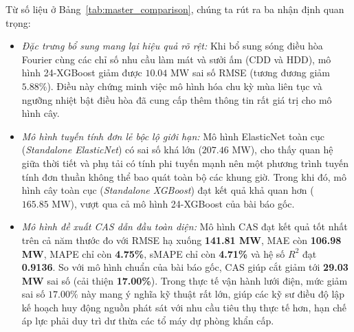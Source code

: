 Từ số liệu ở Bảng~\ref{tab:master_comparison}, chúng ta rút ra ba nhận định quan trọng:
\begin{itemize}
    \item \textit{Đặc trưng bổ sung mang lại hiệu quả rõ rệt:} Khi bổ sung sóng điều hòa Fourier cùng các chỉ số nhu cầu làm mát và sưởi ấm (CDD và HDD), mô hình 24-XGBoost giảm được $10.04\text{ MW}$ sai số RMSE (tương đương giảm $5.88\%$). Điều này chứng minh việc mô hình hóa chu kỳ mùa liên tục và ngưỡng nhiệt bật điều hòa đã cung cấp thêm thông tin rất giá trị cho mô hình cây.
    \item \textit{Mô hình tuyến tính đơn lẻ bộc lộ giới hạn:} Mô hình ElasticNet toàn cục (\textit{Standalone ElasticNet}) có sai số khá lớn ($207.46\text{ MW}$), cho thấy quan hệ giữa thời tiết và phụ tải có tính phi tuyến mạnh nên một phương trình tuyến tính đơn thuần không thể bao quát toàn bộ các khung giờ. Trong khi đó, mô hình cây toàn cục (\textit{Standalone XGBoost}) đạt kết quả khả quan hơn ($165.85\text{ MW}$), vượt qua cả mô hình 24-XGBoost của bài báo gốc.
    \item \textit{Mô hình đề xuất CAS dẫn đầu toàn diện:} Mô hình CAS đạt kết quả tốt nhất trên cả năm thước đo với RMSE hạ xuống \textbf{141.81 MW}, MAE còn \textbf{106.98 MW}, MAPE chỉ còn \textbf{4.75\%}, sMAPE chỉ còn \textbf{4.71\%} và hệ số $R^2$ đạt \textbf{0.9136}. So với mô hình chuẩn của bài báo gốc, CAS giúp cắt giảm tới \textbf{29.03 MW} sai số (cải thiện \textbf{17.00\%}). Trong thực tế vận hành lưới điện, mức giảm sai số $17.00\%$ này mang ý nghĩa kỹ thuật rất lớn, giúp các kỹ sư điều độ lập kế hoạch huy động nguồn phát sát với nhu cầu tiêu thụ thực tế hơn, hạn chế áp lực phải duy trì dư thừa các tổ máy dự phòng khẩn cấp.
\end{itemize}

